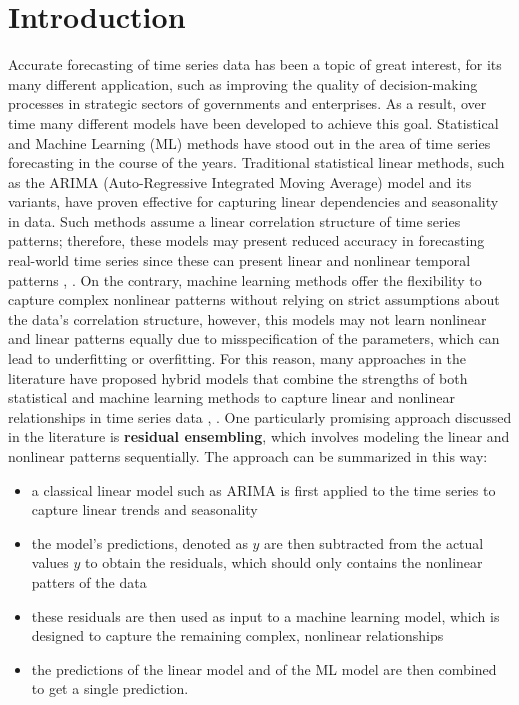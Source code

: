 \chapter{Introduction}
Accurate forecasting of time series data has been a topic of great interest, for its many different application, such as improving the quality of decision-making processes in strategic sectors of governments and enterprises. As a result, over time many different models have been developed to achieve this goal. Statistical and Machine Learning (ML) methods have stood out in the area of time series forecasting in the course of the years. Traditional statistical linear methods, such as the ARIMA (Auto-Regressive Integrated Moving Average) model and its variants, have proven effective for capturing linear dependencies and seasonality in data. Such methods assume a linear correlation structure of time series patterns; therefore, these models may present reduced accuracy in forecasting real-world time series since these can present linear and nonlinear temporal patterns \cite{SANTOSJUNIOR2023119614}, \cite{kontopoulou2023review}. On the contrary, machine learning methods offer the flexibility to capture complex nonlinear patterns without relying on strict assumptions about the data's correlation structure, however, this models may not learn nonlinear and linear patterns equally due to misspecification of the parameters, which can lead to underfitting or overfitting. For this reason, many approaches in the literature have proposed hybrid models that combine the strengths of both statistical and machine learning methods to capture linear and nonlinear relationships in time series data \cite{zhang2003hybrid}, \cite{abraham2017hybrid}. One particularly promising approach discussed in the literature is \textbf{residual ensembling}, which involves modeling the linear and nonlinear patterns sequentially. The approach can be summarized in this way:
\begin{itemize}
    \item a classical linear model such as ARIMA is first applied to the time series to capture linear trends and seasonality
    \item the model’s predictions, denoted as $\hat{y}$ are then subtracted from the actual values $y$ to obtain the residuals, which should only contains the nonlinear patters of the data
    \item these residuals are then used as input to a machine learning model, which is designed to capture the remaining complex, nonlinear relationships
    \item the predictions of the linear model and of the ML model are then combined to get a single prediction.
\end{itemize}
